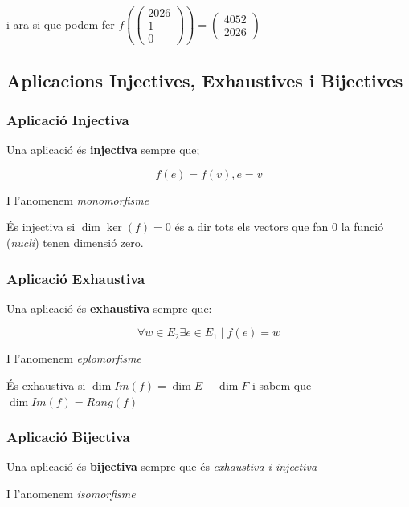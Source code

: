 \documentclass[12pt]{article}
\begin{document}
i ara si que podem fer $f(\begin{pmatrix}
    2026\\
    1\\
    0
\end{pmatrix}) = \begin{pmatrix}
    4052\\
    2026
\end{pmatrix}$

\subsection{Aplicacions Injectives, Exhaustives i Bijectives}

\subsubsection{Aplicació Injectiva}

Una aplicació és \textbf{injectiva} sempre que;

\[f(e) = f(v), e=v\]

I l'anomenem \textit{monomorfisme}

És injectiva si $\dim \ker(f) = 0$ és a dir tots els vectors que fan 0 la funció (\textit{nucli}) tenen dimensió zero.

\subsubsection{Aplicació Exhaustiva}

Una aplicació és \textbf{exhaustiva} sempre que:

\[\forall w \in E_2 \exists e \in E_1 \mid  f(e) = w\]

I l'anomenem \textit{eplomorfisme}

És exhaustiva si $\dim Im(f) = \dim E - \dim F$ i sabem que $\dim Im(f) = Rang(f)$

\subsubsection{Aplicació Bijectiva}

Una aplicació és \textbf{bijectiva} sempre que és \textit{exhaustiva i injectiva}

I l'anomenem \textit{isomorfisme}
\end{document}

